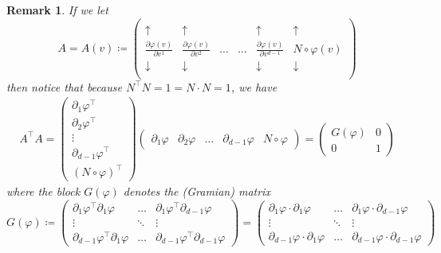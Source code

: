\documentclass{article}
\newcommand{\p}{\partial}
\newcommand{\f}[2]{\frac{#1}{#2}}
\theoremstyle{theorem}
\newtheorem{remark}{Remark}
\begin{document}
\begin{remark}\label{rem:ATA}
If we let 
\begin{equation*}
    A = A(v) \coloneqq \left(\begin{array}{ccccc|c}
     & & & & &\\
    \uparrow &\uparrow & & & \uparrow &\uparrow \\ 
    \f{\p \varphi(v)}{\p v^1}& \f{\p \varphi(v)}{\p v^2} & \dots &\dots&\f{\p \varphi(v)}{\p v^{d-1}}& N\circ \varphi(v) \\
    \downarrow  &\downarrow  & & & \downarrow  &\downarrow \\ 
    &&&& & 
    \end{array}\right)
\end{equation*}
then notice that because $N^\top N  = 1 = N\cdot N = 1$, we have 
\begin{eqnarray*}
    A^\top A = \begin{pmatrix}
    \p_1 \varphi^\top \\
    \p_2 \varphi^\top \\
    \vdots \\
    \p_{d-1} \varphi^\top \\
    (N\circ \varphi)^\top
    \end{pmatrix}\begin{pmatrix}
    \p_1 \varphi &
    \p_2 \varphi &
    \dots &
    \p_{d-1} \varphi&
    N\circ \varphi
    \end{pmatrix}
    =\begin{pmatrix}
    G(\varphi) & 0 \\ 0 & 1
    \end{pmatrix}
\end{eqnarray*}
where the block $G(\varphi)$ denotes the (Gramian) matrix
\begin{equation*}
    G(\varphi) \coloneqq \begin{pmatrix} 
    \p_1 \varphi^\top \p_1 \varphi & \dots & \p_1 \varphi^\top \p_{d-1}\varphi \\
    \vdots & \ddots & \vdots \\
    \p_{d-1} \varphi^\top \p_1 \varphi & \dots & \p_{d-1} \varphi^\top \p_{d-1}\varphi 
    \end{pmatrix}
    = 
    \begin{pmatrix} 
    \p_1 \varphi \cdot \p_1 \varphi & \dots & \p_1 \varphi\cdot \p_{d-1}\varphi \\
    \vdots & \ddots & \vdots \\
    \p_{d-1} \varphi \cdot\p_1 \varphi & \dots & \p_{d-1} \varphi \cdot \p_{d-1}\varphi 

\end{pmatrix}
\end{equation*}
\end{remark}
\end{document}
